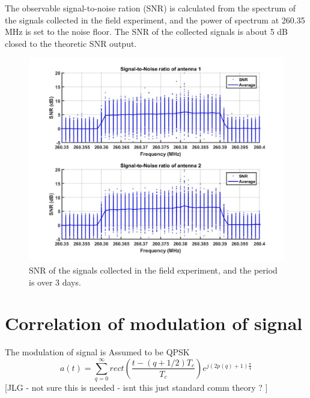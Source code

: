 \documentclass[draftcls,onecolumn]{IEEEtran}  %
\begin{document}
The observable signal-to-noise ration (SNR) is calculated from the spectrum of the signals collected in the field experiment, and the power of spectrum at 260.35 MHz is set to the noise floor. The SNR of the collected signals is about 5 dB closed to the theoretic SNR output.
\begin{figure}[h]
	\centering
	\includegraphics[width=\textwidth]{pdf/SNR.jpg}
	\caption{SNR of the signals collected in the field experiment, and the period is over 3 days.}
	\centering
	\label{fig:link_budget}
\end{figure}

   
   
\section{Correlation of modulation of signal} \label{App: Ra}
The modulation of signal is Assumed to be QPSK
\begin{equation}
a(t)=\sum_{q=0}^{\infty}rect(\frac{t-(q+1/2)T_c}{T_c})e^{j(2p(q)+1)\frac{\pi}{4}}
\end{equation}
[JLG - not sure this is needed - isnt this just standard comm theory ? ]
\end{document}
